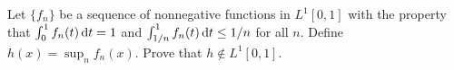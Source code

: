 \begin{problem}
  Let $\{f_n\}$ be a sequence of nonnegative functions in $L^1[0,1]$ with
  the property that $\int_0^1 f_n(t)\mathop{}\!\mathrm{d} t=1$ and $\int_{1/n}^1
  f_n(t)\mathop{}\!\mathrm{d} t\leq 1/n$ for all $n$. Define $h(x)=\sup_n f_n(x)$. Prove
  that $h\notin L^1[0,1]$.
\end{problem}
\begin{solution}
\end{solution}

